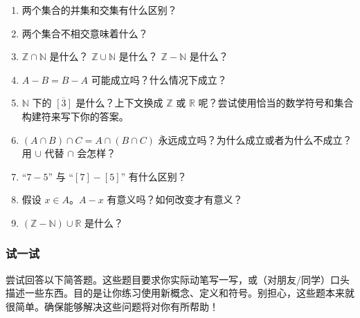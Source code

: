 \begin{enumerate}[label=(\arabic*)]
    \item 两个集合的并集和交集有什么区别？
    \item 两个集合不相交意味着什么？
    \item $\mathbb{Z} \cap \mathbb{N}$ 是什么？ $\mathbb{Z} \cup \mathbb{N}$ 是什么？ $\mathbb{Z}-\mathbb{N}$ 是什么？
    \item $A - B = B - A$ 可能成立吗？什么情况下成立？
    \item $\mathbb{N}$ 下的 $\overline{[3]}$ 是什么？上下文换成 $\mathbb{Z}$ 或 $\mathbb{R}$ 呢？尝试使用恰当的数学符号和集合构建符来写下你的答案。
    \item $(A \cap B) \cap C = A \cap (B \cap C)$ 永远成立吗？为什么成立或者为什么不成立？ 用 $\cup$ 代替 $\cap$ 会怎样？
    \item ``$7-5$'' 与 ``$[7]-[5]$'' 有什么区别？
    \item 假设 $x \in A$。$A - x$ 有意义吗？如何改变才有意义？
    \item $(\mathbb{Z} - \mathbb{N}) \cup \mathbb{R}$ 是什么？
\end{enumerate}

\subsubsection*{试一试}

尝试回答以下简答题。这些题目要求你实际动笔写一写，或（对朋友/同学）口头描述一些东西。目的是让你练习使用新概念、定义和符号。别担心，这些题本来就很简单。确保能够解决这些问题将对你有所帮助！

